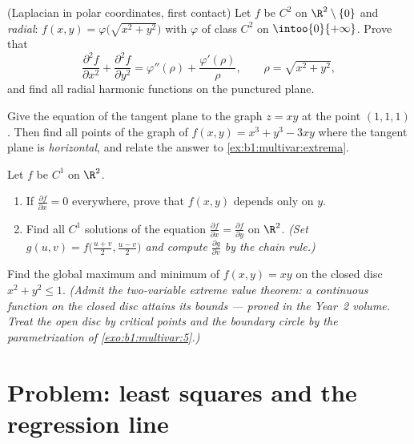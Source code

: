 \begin{exercise}[$\star\star\star$]\label{exo:b1:multivar:9}
(Laplacian in polar coordinates, first contact) Let $f$ be $C^2$ on
$\R^2 \setminus \{0\}$ and \emph{radial}: $f(x, y) =
\varphi\bigl(\sqrt{x^2+y^2}\bigr)$ with $\varphi$ of class $C^2$ on
$\intoo{0}{+\infty}$. Prove that
\[
\frac{\partial^2 f}{\partial x^2} + \frac{\partial^2 f}{\partial
y^2} = \varphi''(\rho) + \frac{\varphi'(\rho)}{\rho},
\qquad \rho = \sqrt{x^2 + y^2},
\]
and find all radial harmonic functions on the punctured plane.
\end{exercise}

\begin{exercise}[$\star\star$]\label{exo:b1:multivar:10}
Give the equation of the tangent plane to the graph $z = xy$ at
the point $(1, 1, 1)$. Then find all points of the graph of
$f(x,y) = x^3 + y^3 - 3xy$ where the tangent plane is
\emph{horizontal}, and relate the answer to
\cref{ex:b1:multivar:extrema}.
\end{exercise}

\begin{exercise}[$\star\star$]\label{exo:b1:multivar:11}
Let $f$ be $C^1$ on $\R^2$.
\begin{enumerate}
  \item If $\frac{\partial f}{\partial x} = 0$ everywhere, prove
        that $f(x, y)$ depends only on $y$.
  \item Find all $C^1$ solutions of the equation
        $\frac{\partial f}{\partial x} = \frac{\partial
        f}{\partial y}$ on $\R^2$. \emph{(Set $g(u, v) =
        f\bigl(\frac{u+v}2, \frac{u-v}2\bigr)$ and compute
        $\frac{\partial g}{\partial v}$ by the chain rule.)}
\end{enumerate}
\end{exercise}

\begin{exercise}[$\star\star\star$]\label{exo:b1:multivar:12}
Find the global maximum and minimum of $f(x, y) = xy$ on the
closed disc $x^2 + y^2 \leq 1$. \emph{(Admit the two-variable
extreme value theorem: a continuous function on the closed disc
attains its bounds --- proved in the Year~2 volume. Treat the
open disc by critical points and the boundary circle by the
parametrization of \cref{exo:b1:multivar:5}.)}
\end{exercise}

\section{Problem: least squares and the regression line}

